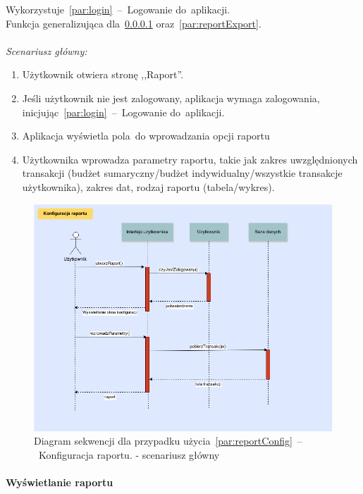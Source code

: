 Wykorzystuje~\ref{par:login}~--~Logowanie do~aplikacji.\\
\indent Funkcja generalizująca dla~\ref{par:reportView} oraz~\ref{par:reportExport}.\\\\
\textit{Scenariusz główny:}
\begin{enumerate}
  \item Użytkownik otwiera stronę ,,Raport''.
  \item Jeśli użytkownik nie jest zalogowany, aplikacja wymaga zalogowania, inicjując~\ref{par:login}~--~Logowanie do~aplikacji.
  \item Aplikacja wyświetla pola~do wprowadzania opcji raportu
  \item Użytkownika wprowadza parametry raportu, takie jak zakres uwzględnionych transakcji (budżet sumaryczny/budżet indywidualny/wszystkie transakcje użytkownika), zakres dat, rodzaj raportu (tabela/wykres).
\end{enumerate}

\begin{figure}[H]
    \includegraphics[width=\textwidth,
    height=0.5\textheight]{images/raport_konfig.png}
    \caption{Diagram sekwencji dla przypadku użycia~\ref{par:reportConfig}~--~Konfiguracja raportu.
    - scenariusz główny}
\end{figure}

\paragraph{Wyświetlanie raportu\newline}
\label{par:reportView}

